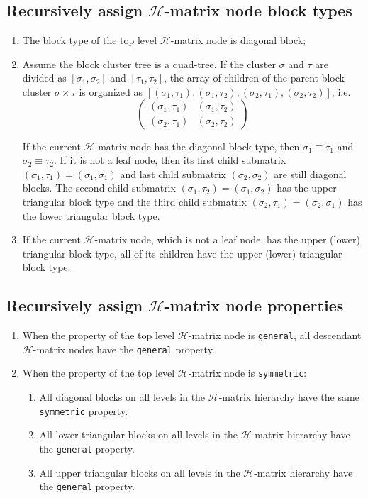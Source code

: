 \documentclass[11pt, a4paper]{book}
\begin{document}
\subsection{Recursively assign $\mathcal{H}$-matrix node block types}
\begin{enumerate}
\item The block type of the top level $\mathcal{H}$-matrix node is diagonal block;
\item Assume the block cluster tree is a quad-tree. If the cluster $\sigma$ and $\tau$
  are divided as $[\sigma_1, \sigma_2]$ and $[\tau_1, \tau_2]$, the array of children of
  the parent block cluster $\sigma\times\tau$ is organized as
  $[(\sigma_1, \tau_1), (\sigma_1, \tau_2), (\sigma_2, \tau_1), (\sigma_2, \tau_2)]$,
  i.e.
  $$
  \begin{pmatrix}
    (\sigma_1, \tau_1) & (\sigma_1, \tau_2) \\
    (\sigma_2, \tau_1) & (\sigma_2, \tau_2)
  \end{pmatrix}
  $$

  If the current $\mathcal{H}$-matrix node has the diagonal block type, then
  $\sigma_1 \equiv \tau_1$ and $\sigma_2 \equiv \tau_2$. If it is not a leaf node, then
  its first child submatrix $(\sigma_1, \tau_1) = (\sigma_1, \sigma_1)$ and last child
  submatrix $(\sigma_2, \sigma_2)$ are still diagonal blocks. The second child submatrix
  $(\sigma_1, \tau_2) = (\sigma_1, \sigma_2)$ has the upper triangular block type and
  the third child submatrix $(\sigma_2,\tau_1) = (\sigma_2,\sigma_1)$ has the lower
  triangular block type.
\item If the current $\mathcal{H}$-matrix node, which is not a leaf node, has the upper
  (lower) triangular block type, all of its children have the upper (lower) triangular
  block type.
\end{enumerate}  

\subsection{Recursively assign $\mathcal{H}$-matrix node properties}

\begin{enumerate}
\item When the property of the top level $\mathcal{H}$-matrix node is \texttt{general}, all descendant
  $\mathcal{H}$-matrix nodes have the \texttt{general} property.
\item When the property of the top level $\mathcal{H}$-matrix node is \texttt{symmetric}:
  \begin{enumerate}
  \item All diagonal blocks on all levels in the $\mathcal{H}$-matrix hierarchy have the
    same \texttt{symmetric} property.
  \item All lower triangular blocks on all levels in the $\mathcal{H}$-matrix hierarchy
    have the \texttt{general} property.
  \item All upper triangular blocks on all levels in the $\mathcal{H}$-matrix hierarchy
    have the \texttt{general} property.
  \end{enumerate}  
\end{enumerate}
\end{document}
